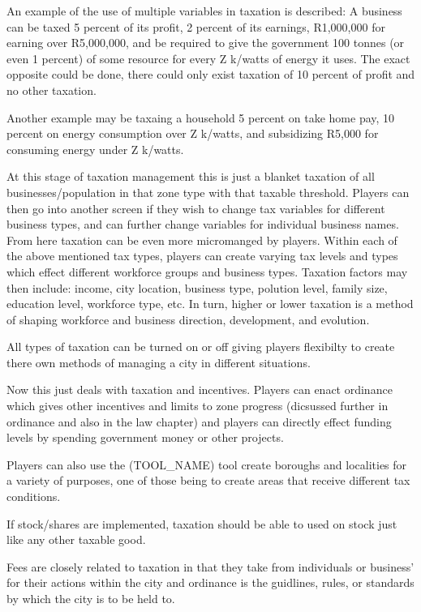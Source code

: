 An example of the use of multiple variables in taxation is described:
A business can be taxed 5 percent of its profit, 2 percent of its earnings, R1,000,000 for earning over R5,000,000, and be required to give the government 100 tonnes (or even 1 percent) of some resource for every Z k/watts of energy it uses. The exact opposite could be done, there could only exist taxation of 10 percent of profit and no other taxation. 

Another example may be taxaing a household 5 percent on take home pay, 10 percent on energy consumption over Z k/watts, and subsidizing R5,000 for consuming energy under Z k/watts.


At this stage of taxation management this is just a blanket taxation of all businesses/population in that zone type with that taxable threshold. Players can then go into another screen if they wish to change tax variables for different business types, and can further change variables for individual business names. From here taxation can be even more micromanged by players. Within each of the above mentioned tax types, players can create varying tax levels and types which effect different workforce groups and business types. Taxation factors may then include: income, city location, business type, polution level, family size, education level, workforce type, etc. In turn, higher or lower taxation is a method of shaping workforce and business direction, development, and evolution. 

All types of taxation can be turned on or off giving players flexibilty to create there own methods of managing a city in different situations.

Now this just deals with taxation and incentives. Players can enact ordinance which gives other incentives and limits to zone progress (dicsussed further in ordinance and also in the law chapter) and players can directly effect funding levels by spending government money or other projects. 


Players can also use the (TOOL_NAME) tool create boroughs and localities for a variety of purposes, one of those being to create areas that receive different tax conditions.
 
If stock/shares are implemented, taxation should be able to used on stock just like any other taxable good.




Fees are closely related to taxation in that they take from individuals or business' for their actions within the city and ordinance is the guidlines, rules, or standards by which the city is to be held to.

